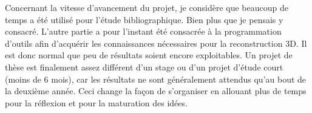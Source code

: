 \vspace{5mm}

Concernant la vitesse d'avancement du projet, je considère que beaucoup de temps a été utilisé pour l'étude bibliographique.
Bien plus que je pensais y consacré.
L'autre partie a pour l'instant été consacrée à la programmation d'outils afin d'acquérir les connaissances nécessaires pour la reconstruction 3D.
Il est donc normal que peu de résultats soient encore exploitables.
Un projet de thèse est finalement assez différent d'un stage ou d'un projet d'étude court (moins de 6 mois), car les résultats ne sont généralement attendus qu'au bout de la deuxième année.
Ceci change la façon de s'organiser en allouant plus de temps pour la réflexion et pour la maturation des idées.
